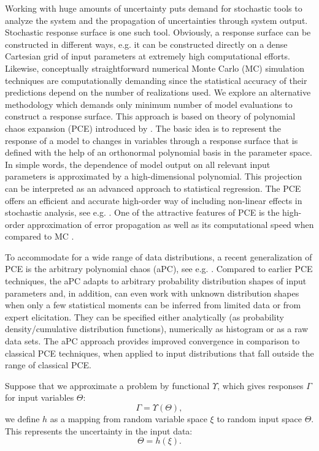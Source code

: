 Working with huge amounts of uncertainty puts demand for stochastic tools to
analyze the system and the propagation of uncertainties through system output.
Stochastic response surface is one such tool. Obviously, a response surface can
be constructed in different ways, e.g. it can be constructed directly on a dense
Cartesian grid of input parameters at extremely high computational efforts.
Likewise, conceptually straightforward numerical Monte Carlo (MC) simulation
techniques are computationally demanding since the statistical accuracy of their
predictions depend on the number of realizations used. We explore an alternative
methodology which demands only minimum number of model evaluations to construct
a response surface. This approach is based on theory of polynomial chaos
expansion (PCE) introduced by \cite{Wiener1938}. The basic idea is to represent
the response of a model to changes in variables through a response surface that
is defined with the help of an orthonormal polynomial basis in the parameter 
space.  In simple words, the dependence of model output on all relevant input
parameters is approximated by a high-dimensional polynomial.  This projection
can be interpreted as an advanced approach to statistical regression.  The PCE
offers an efficient and accurate high-order way of including non-linear effects
in stochastic analysis, see e.g. \cite{Zhang_Lu_2004_JCP,foo_pcm_JCP2010,
Fajraoui_al_2011_WRR}. One of the attractive features of PCE is the high-order
approximation of error propagation
\cite{Ghanem_Spanos_1990_PC_in_SFEM,Ghanem_Spanos_1991_SFEM_book} as well as its
computational speed when compared to MC \cite{oladyshkinintegrative}. 

To accommodate for a wide range of data distributions, a recent generalization
of PCE is the arbitrary polynomial chaos (aPC), see e.g.
\cite{oladyshkin2011concept}. Compared to earlier PCE techniques, the aPC adapts
to arbitrary probability distribution shapes of input parameters and, in
addition, can even work with unknown distribution shapes when only a few
statistical moments can be inferred from limited data or from expert
elicitation. They can be specified either analytically (as probability
density/cumulative distribution functions), numerically as histogram or as a raw
data sets. The aPC approach provides improved convergence in comparison to
classical PCE techniques, when applied to input distributions that fall outside
the range of classical PCE. 

Suppose that we approximate a problem by functional $\Upsilon$, which gives
responses $\Gamma$ for input variables $\Theta$:
%
\begin{equation}
  \Gamma=\Upsilon(\Theta),
  \label{eq:1}
\end{equation} 
%
we define $h$ as a mapping from random variable space $\xi$ to random input
space $\Theta$. This represents the uncertainty in the input data:
%
\begin{equation}
  \Theta=h(\xi).
  \label{eq:rand}
\end{equation}
%

